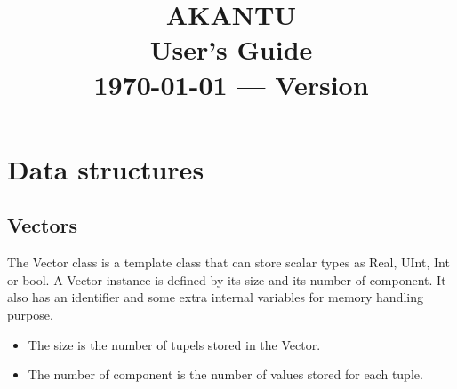 \documentclass[a4paper,11pt]{book}
\title{\textbf{\Huge AKANTU}\\
  \vspace{0.5cm}
  \textbf{\huge User's Guide}\\
  \vspace{1cm}
  {\small \today{} --- Version \version}
}
\date{}
\begin{document}
\maketitle

\tableofcontents

\chapter{Data structures\label{chap:data-structure}}

\section{Vectors\label{sec:vectors}}

The Vector class is a template class  that can store scalar types as Real, UInt,
Int  or bool.   A Vector  instance is  defined  by its  size and  its number  of
component.  It also  has an  identifier and  some extra  internal  variables for
memory handling purpose.

\begin{itemize}
\item The size is the number of tupels stored in the Vector.
\item The number of component is the number of values stored for each tuple.
\end{itemize}
\end{document}
